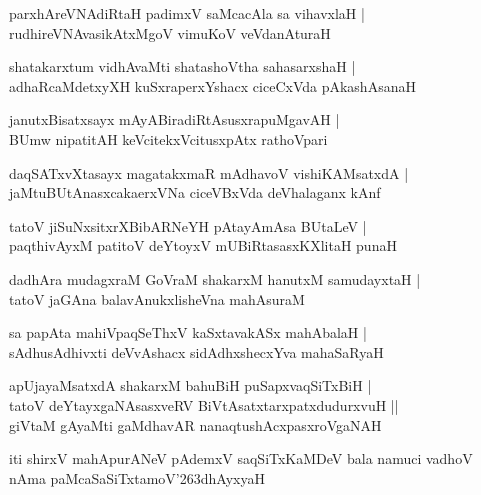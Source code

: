 \documentclass[twoside,12pt,openright]{book}
\def\S{\char'263}
\newcounter{shloka}[chapter]
\begin{document}
\begin{shloka}%
parxhAreVNAdiRtaH padimxV saMcacAla sa vihavxlaH |\\
rudhireVNAvasikAtxMgoV vimuKoV veVdanAturaH
\end{shloka}

\begin{shloka}%
shatakarxtum vidhAvaMti shatashoVtha sahasarxshaH |\\
adhaRcaMdetxyXH kuSxraperxYshacx ciceCxVda pAkashAsanaH
\end{shloka}

\begin{shloka}%
janutxBisatxsayx mAyABiradiRtAsusxrapuMgavAH |\\
BUmw nipatitAH keVcitekxVcitusxpAtx rathoVpari 
\end{shloka}

\begin{shloka}%
daqSATxvXtasayx magatakxmaR mAdhavoV vishiKAMsatxdA |\\
jaMtuBUtAnasxcakaerxVNa ciceVBxVda deVhalaganx kAnf 
\end{shloka}

\begin{shloka}%
tatoV jiSuNxsitxrXBibARNeYH pAtayAmAsa BUtaLeV |\\
paqthivAyxM patitoV deYtoyxV mUBiRtasasxKXlitaH punaH
\end{shloka}

\begin{shloka}%
dadhAra mudagxraM GoVraM shakarxM hanutxM samudayxtaH |\\
tatoV jaGAna balavAnukxlisheVna mahAsuraM 
\end{shloka}

\begin{shloka}%
sa papAta mahiVpaqSeThxV kaSxtavakASx mahAbalaH |\\
sAdhusAdhivxti deVvAshacx sidAdhxshecxYva mahaSaRyaH
\end{shloka}

\begin{shloka}%
apUjayaMsatxdA shakarxM bahuBiH puSapxvaqSiTxBiH |\\
tatoV deYtayxgaNAsasxveRV BiVtAsatxtarxpatxdudurxvuH ||\\
giVtaM gAyaMti gaMdhavAR nanaqtushAcxpasxroVgaNAH 
\end{shloka}

\begin{center}
iti shirxV mahApurANeV pAdemxV saqSiTxKaMDeV bala namuci vadhoV nAma paMcaSaSiTxtamoV\S dhAyxyaH
\end{center}
\end{document}
